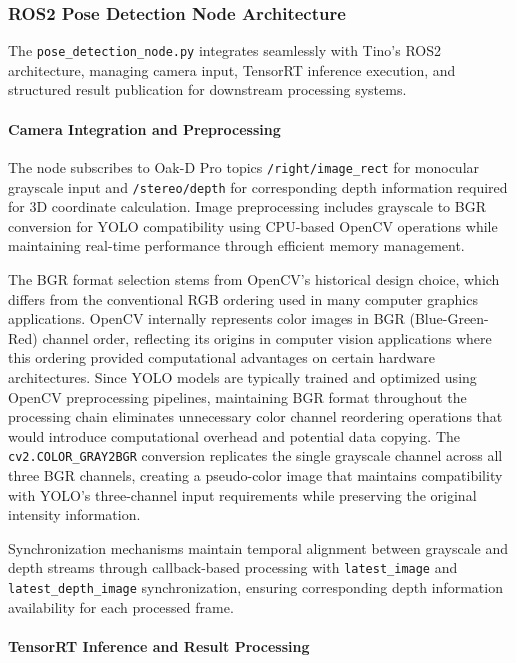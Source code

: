 \subsubsection{ROS2 Pose Detection Node Architecture}

The \texttt{pose\_detection\_node.py} integrates seamlessly with Tino's ROS2 architecture, managing camera input, TensorRT inference execution, and structured result publication for downstream processing systems.

\paragraph{Camera Integration and Preprocessing}

The node subscribes to Oak-D Pro topics \texttt{/right/image\_rect} for monocular grayscale input and \texttt{/stereo/depth} for corresponding depth information required for 3D coordinate calculation. Image preprocessing includes grayscale to BGR conversion for YOLO compatibility using CPU-based OpenCV operations while maintaining real-time performance through efficient memory management.

The BGR format selection stems from OpenCV's historical design choice, which differs from the conventional RGB ordering used in many computer graphics applications. OpenCV internally represents color images in BGR (Blue-Green-Red) channel order, reflecting its origins in computer vision applications where this ordering provided computational advantages on certain hardware architectures. Since YOLO models are typically trained and optimized using OpenCV preprocessing pipelines, maintaining BGR format throughout the processing chain eliminates unnecessary color channel reordering operations that would introduce computational overhead and potential data copying. The \texttt{cv2.COLOR\_GRAY2BGR} conversion replicates the single grayscale channel across all three BGR channels, creating a pseudo-color image that maintains compatibility with YOLO's three-channel input requirements while preserving the original intensity information.

Synchronization mechanisms maintain temporal alignment between grayscale and depth streams through callback-based processing with \texttt{latest\_image} and \texttt{latest\_depth\_image} synchronization, ensuring corresponding depth information availability for each processed frame.

\paragraph{TensorRT Inference and Result Processing}


